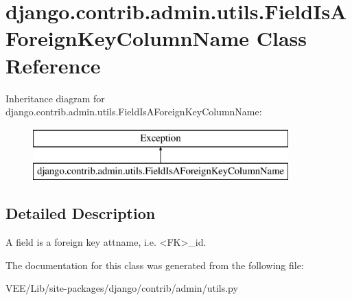 \hypertarget{classdjango_1_1contrib_1_1admin_1_1utils_1_1_field_is_a_foreign_key_column_name}{}\section{django.\+contrib.\+admin.\+utils.\+Field\+Is\+A\+Foreign\+Key\+Column\+Name Class Reference}
\label{classdjango_1_1contrib_1_1admin_1_1utils_1_1_field_is_a_foreign_key_column_name}
Inheritance diagram for django.\+contrib.\+admin.\+utils.\+Field\+Is\+A\+Foreign\+Key\+Column\+Name\+:\begin{figure}[H]
\begin{center}
\leavevmode
\includegraphics[height=2.000000cm]{classdjango_1_1contrib_1_1admin_1_1utils_1_1_field_is_a_foreign_key_column_name}
\end{center}
\end{figure}


\subsection{Detailed Description}
\begin{DoxyVerb}A field is a foreign key attname, i.e. <FK>_id.\end{DoxyVerb}
 

The documentation for this class was generated from the following file\+:\begin{DoxyCompactItemize}
\item 
V\+E\+E/\+Lib/site-\/packages/django/contrib/admin/utils.\+py\end{DoxyCompactItemize}
